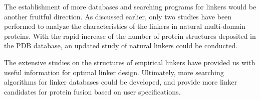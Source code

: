 The establishment of more databases and searching programs for linkers would be another fruitful direction. 
As discussed earlier, only two studies have been performed to analyze the characteristics of the linkers in natural multi-domain proteins.
With the rapid increase of the number of protein structures deposited in the PDB database, an updated study of natural linkers could be conducted.

The extensive studies on the structures of empirical linkers have provided us with useful information for optimal linker design. 
Ultimately, more searching algorithms for linker databases could be developed, and provide more linker candidates for protein fusion based on user specifications.



